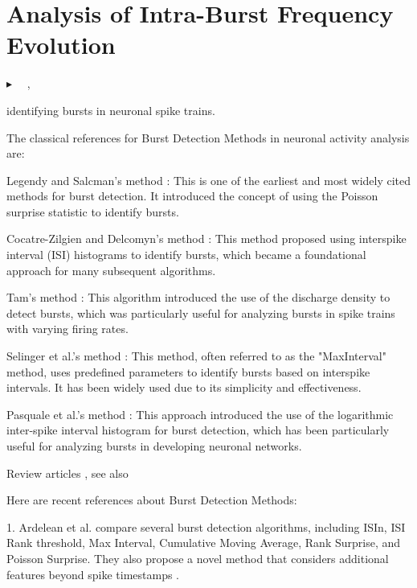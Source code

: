 \documentclass[a4paper,9pt]{extarticle}
\newcommand{\fcite}[1]{{{\noindent\footnotesize$\blacktriangleright$\ }\color{ColorCite} \citeauthor{#1}~\citeyear{#1}, \citetitle{#1}~\cite{#1}}}
\begin{document}
\section{Analysis of Intra-Burst Frequency Evolution}


\fcite{wilson2002a}  

identifying bursts in neuronal spike trains.


\cite{wu_jiannis2019a}

\cite{rieke1999a}

\cite{chen2013a}




The classical references for Burst Detection Methods in neuronal activity analysis are:

Legendy and Salcman's method \cite{legendy1985a}:
This is one of the earliest and most widely cited methods for burst detection. It introduced the concept of using the Poisson surprise statistic to identify bursts.

Cocatre-Zilgien and Delcomyn's method \cite{cocatre-zilgien1992a}:
This method proposed using interspike interval (ISI) histograms to identify bursts, which became a foundational approach for many subsequent algorithms.

Tam's method \cite{tam2002a}:
This algorithm introduced the use of the discharge density to detect bursts, which was particularly useful for analyzing bursts in spike trains with varying firing rates.

Selinger et al.'s method \cite{selinger2007a}:
This method, often referred to as the "MaxInterval" method, uses predefined parameters to identify bursts based on interspike intervals. It has been widely used due to its simplicity and effectiveness.

Pasquale et al.'s method \cite{pasquale2010a}:
This approach introduced the use of the logarithmic inter-spike interval histogram for burst detection, which has been particularly useful for analyzing bursts in developing neuronal networks.


Review articles \cite{cotterill2016a,cotterill2019a}, see also \cite{pasquale2010a}


\bigskip


Here are recent references about Burst Detection Methods:

1. Ardelean et al. \cite{ardelean2023a} compare several burst detection algorithms, including ISIn, ISI Rank threshold, Max Interval, Cumulative Moving Average, Rank Surprise, and Poisson Surprise. They also propose a novel method that considers additional features beyond spike timestamps \cite{ardelean2023b}.
\end{document}
